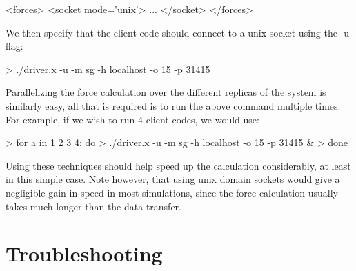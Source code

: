 \documentclass[11pt,english,fleqn]{report}
\newenvironment{code}{%
\footnotesize 
\verbatim
}{
\endverbatim
\normalsize
}
\begin{document}
\begin{code}
<forces>
   <socket mode='unix'>
      ...
   </socket>
</forces>
\end{code}

We then specify that the client code should connect to a unix socket
using the -u flag:

\begin{code}
> ./driver.x -u -m sg -h localhost -o 15 -p 31415
\end{code}

Parallelizing the force calculation over the different replicas of the system
is similarly easy, all that is required is to run the above
command multiple times. For example, if we wish to run
4 client codes, we would use:

\begin{code}
> for a in 1 2 3 4; do
>    ./driver.x -u -m sg -h localhost -o 15 -p 31415 &
> done
\end{code}

Using these techniques should help speed up the calculation considerably,
at least in this simple case. Note however, that using unix domain sockets
would give a negligible gain in speed in most simulations, 
since the force calculation usually takes much longer than the data transfer. 

\chapter{Troubleshooting}

\label{trouble}
\end{document}
